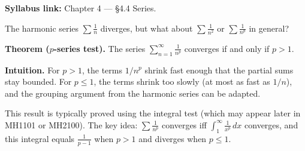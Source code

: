 \begin{extension}[title={Extension (Beyond Syllabus: $p$-series preview and the integral test connection)}]

\textbf{Syllabus link:} Chapter 4 --- \S4.4 Series.

\medskip

The harmonic series $\sum \frac{1}{n}$ diverges, but what about $\sum \frac{1}{n^2}$ or $\sum \frac{1}{n^p}$ in general?

\textbf{Theorem ($p$-series test).}
The series $\displaystyle\sum_{n=1}^{\infty}\frac{1}{n^p}$ converges if and only if $p>1$.

\textbf{Intuition.}
For $p>1$, the terms $1/n^p$ shrink fast enough that the partial sums stay bounded.
For $p\le 1$, the terms shrink too slowly (at most as fast as $1/n$), and the grouping argument from the harmonic series can be adapted.

This result is typically proved using the integral test (which may appear later in MH1101 or MH2100). The key idea: $\sum \frac{1}{n^p}$ converges iff $\int_1^{\infty}\frac{1}{x^p}\,dx$ converges, and this integral equals $\frac{1}{p-1}$ when $p>1$ and diverges when $p\le 1$.

\end{extension}

